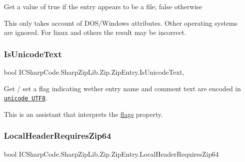 Get a value of true if the entry appears to be a file; false otherwise 

This only takes account of D\+O\+S/\+Windows attributes. Other operating systems are ignored. For linux and others the result may be incorrect. \mbox{\label{class_i_c_sharp_code_1_1_sharp_zip_lib_1_1_zip_1_1_zip_entry_aa32b0c96d285080ccdd80db5bb22e73c}} 
\subsubsection{\texorpdfstring{Is\+Unicode\+Text}{IsUnicodeText}}
{\footnotesize\ttfamily bool I\+C\+Sharp\+Code.\+Sharp\+Zip\+Lib.\+Zip.\+Zip\+Entry.\+Is\+Unicode\+Text\hspace{0.3cm}{\ttfamily [get]}, {\ttfamily [set]}}



Get / set a flag indicating wether entry name and comment text are encoded in \href{http://www.unicode.org}{\tt unicode U\+T\+F8}. 

This is an assistant that interprets the \hyperlink{class_i_c_sharp_code_1_1_sharp_zip_lib_1_1_zip_1_1_zip_entry_a144e1d24c10438c31ccffab26073d40b}{flags} property.\mbox{\label{class_i_c_sharp_code_1_1_sharp_zip_lib_1_1_zip_1_1_zip_entry_a10a032c85a2ca3eab7079e44770b4e7a}} 
\subsubsection{\texorpdfstring{Local\+Header\+Requires\+Zip64}{LocalHeaderRequiresZip64}}
{\footnotesize\ttfamily bool I\+C\+Sharp\+Code.\+Sharp\+Zip\+Lib.\+Zip.\+Zip\+Entry.\+Local\+Header\+Requires\+Zip64\hspace{0.3cm}{\ttfamily [get]}}



